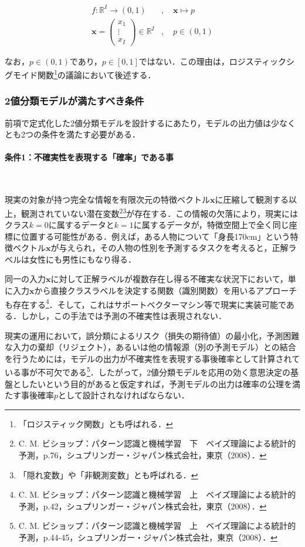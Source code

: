 \documentclass[a4paper,dvipdfmx]{jarticle}
\begin{document}
\begin{align}
  f: \mathbb{R}^I \to (0, 1) &,\quad \bm{x} \mapsto p \label{mapping_binary_classification} \\
  \bm{x} = \begin{pmatrix}
    x_1 \\
    \vdots \\
    x_I
  \end{pmatrix} \in \mathbb{R}^I &,\quad p \in (0, 1) \nonumber
\end{align}

なお，$p \in (0, 1)$であり，$p \in [0, 1]$ではない．この理由は，ロジスティックシグモイド関数\footnote{「ロジスティック関数」とも呼ばれる．}の議論において後述する．

\subsubsection{2値分類モデルが満たすべき条件}

前項で定式化した2値分類モデルを設計するにあたり，モデルの出力値は少なくとも2つの条件を満たす必要がある．

\paragraph{条件1：不確実性を表現する「確率」である事}　%

現実の対象が持つ完全な情報を有限次元の特徴ベクトル$\bm{x}$に圧縮して観測する以上，観測されていない潜在変数\footnote{C. M. ビショップ：パターン認識と機械学習　下　ベイズ理論による統計的予測，p.76，シュプリンガー・ジャパン株式会社，東京（2008）．}\footnote{「隠れ変数」や「非観測変数」とも呼ばれる．}が存在する．この情報の欠落により，現実にはクラス$k=0$に属するデータと$k=1$に属するデータが，特徴空間上で全く同じ座標に位置する可能性がある．例えば，ある人物について「身長170cm」という特徴ベクトル$\bm{x}$が与えられ，その人物の性別を予測するタスクを考えると，正解ラベルは女性にも男性にもなり得る．

同一の入力$\bm{x}$に対して正解ラベルが複数存在し得る不確実な状況下において，単に入力$\bm{x}$から直接クラスラベルを決定する関数（識別関数）を用いるアプローチも存在する\footnote{C. M. ビショップ：パターン認識と機械学習　上　ベイズ理論による統計的予測，p.42，シュプリンガー・ジャパン株式会社，東京（2008）．}．そして，これはサポートベクターマシン等で現実に実装可能である．しかし，この手法では予測の不確実性は表現されない．

現実の運用において，誤分類によるリスク（損失の期待値）の最小化，予測困難な入力の棄却（リジェクト），あるいは他の情報源（別の予測モデル）との結合を行うためには，モデルの出力が不確実性を表現する事後確率として計算されている事が不可欠である\footnote{C. M. ビショップ：パターン認識と機械学習　上　ベイズ理論による統計的予測，p.44-45，シュプリンガー・ジャパン株式会社，東京（2008）．}．したがって，2値分類モデルを応用の効く意思決定の基盤としたいという目的があると仮定すれば，予測モデルの出力は確率の公理を満たす事後確率$p$として設計されなければならない．
\end{document}
